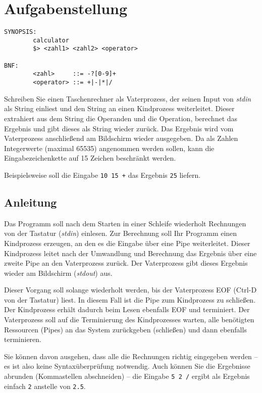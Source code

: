 




\section*{Aufgabenstellung}

\begin{verbatim}
SYNOPSIS:
        calculator
        $> <zahl1> <zahl2> <operator>

BNF:
        <zahl>     ::= -?[0-9]+
        <operator> ::= +|-|*|/

\end{verbatim}

Schreiben Sie einen Taschenrechner als Vaterprozess, der seinen Input
von \emph{stdin} als String einliest und den String an einen
Kindprozess weiterleitet. Dieser extrahiert aus dem String die
Operanden und die Operation, berechnet das Ergebnis und gibt dieses
als String wieder zurück. Das Ergebnis wird vom Vaterprozess
anschließend am Bildschirm wieder ausgegeben. Da als Zahlen
Integerwerte (maximal 65535) angenommen werden sollen, kann die
Eingabezeichenkette auf 15 Zeichen beschränkt werden.


Beispielsweise soll die Eingabe \verb_10 15 +_ das Ergebnis \verb_25_
liefern.

\subsection*{Anleitung}

Das Programm soll nach dem Starten in einer Schleife wiederholt
Rechnungen von der Tastatur (\emph{stdin}) einlesen. Zur
Berechnung soll Ihr Programm einen Kindprozess erzeugen, an den
es die Eingabe über eine Pipe weiterleitet. Dieser Kindprozess
leitet nach der Umwandlung und Berechnung das Ergebnis über eine
zweite Pipe an den Vaterprozess zurück. Der Vaterprozess
gibt dieses Ergebnis wieder am Bildschirm (\emph{stdout}) aus.


Dieser Vorgang soll solange wiederholt werden, bis der Vaterprozess
EOF (Ctrl-D von der Tastatur) liest. In diesem Fall ist die Pipe zum
Kindprozess zu schließen. Der Kindprozess erhält dadurch beim Lesen
ebenfalls EOF und terminiert. Der Vaterprozess soll auf die
Terminierung des Kindprozesses warten, alle benötigten Ressourcen
(Pipes) an das System zurückgeben (schließen) und dann ebenfalls
terminieren.


Sie können davon ausgehen, dass alle die Rechnungen richtig eingegeben
werden – es ist also keine Syntaxüberprüfung notwendig. Auch können
Sie die Ergebnisse abrunden (Kommastellen abschneiden) – die Eingabe
\verb_5 2 /_ ergibt als Ergebnis einfach \verb_2_ anstelle von
\verb_2.5_.

\osueguidelinestwo


